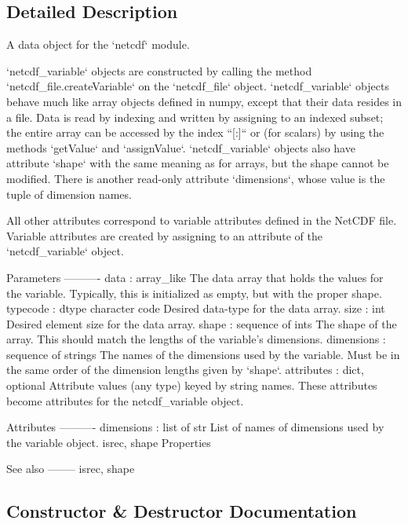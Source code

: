 \subsection{Detailed Description}
\begin{DoxyVerb}A data object for the `netcdf` module.

`netcdf_variable` objects are constructed by calling the method
`netcdf_file.createVariable` on the `netcdf_file` object. `netcdf_variable`
objects behave much like array objects defined in numpy, except that their
data resides in a file. Data is read by indexing and written by assigning
to an indexed subset; the entire array can be accessed by the index ``[:]``
or (for scalars) by using the methods `getValue` and `assignValue`.
`netcdf_variable` objects also have attribute `shape` with the same meaning
as for arrays, but the shape cannot be modified. There is another read-only
attribute `dimensions`, whose value is the tuple of dimension names.

All other attributes correspond to variable attributes defined in
the NetCDF file. Variable attributes are created by assigning to an
attribute of the `netcdf_variable` object.

Parameters
----------
data : array_like
    The data array that holds the values for the variable.
    Typically, this is initialized as empty, but with the proper shape.
typecode : dtype character code
    Desired data-type for the data array.
size : int
    Desired element size for the data array.
shape : sequence of ints
    The shape of the array.  This should match the lengths of the
    variable's dimensions.
dimensions : sequence of strings
    The names of the dimensions used by the variable.  Must be in the
    same order of the dimension lengths given by `shape`.
attributes : dict, optional
    Attribute values (any type) keyed by string names.  These attributes
    become attributes for the netcdf_variable object.


Attributes
----------
dimensions : list of str
    List of names of dimensions used by the variable object.
isrec, shape
    Properties

See also
--------
isrec, shape\end{DoxyVerb}
 

\subsection{Constructor \& Destructor Documentation}
\hypertarget{classscipy_1_1io_1_1netcdf_1_1netcdf__variable_a604e1e2f3b6dccc7ef97bbd55afc63fc}{}
